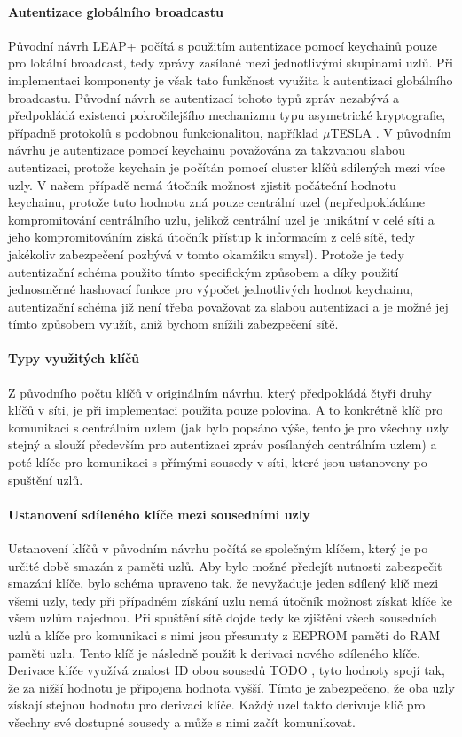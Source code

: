 \documentclass[11pt,final,twoside]{fithesis2}
\begin{document}
\paragraph{Autentizace globálního broadcastu}
Původní návrh LEAP+ počítá s použitím autentizace pomocí keychainů pouze pro lokální broadcast, tedy zprávy zasílané mezi jednotlivými skupinami uzlů. Při implementaci komponenty je však tato funkčnost 
využita k autentizaci globálního broadcastu. Původní návrh se autentizací tohoto typů zpráv nezabývá a předpokládá existenci pokročilejšího mechanizmu typu asymetrické kryptografie, případně protokolů
s podobnou funkcionalitou, například $\mu$TESLA \cite{Perrig2001}. V původním návrhu je autentizace pomocí keychainu považována za takzvanou slabou autentizaci, protože keychain je počítán pomocí 
cluster klíčů sdílených mezi více uzly. V našem případě nemá útočník možnost zjistit počáteční hodnotu keychainu, protože tuto hodnotu zná pouze centrální uzel (nepředpokládáme kompromitování centrálního
uzlu, jelikož centrální uzel je unikátní v celé síti a jeho kompromitováním získá útočník přístup k informacím z celé sítě, tedy jakékoliv zabezpečení pozbývá v tomto okamžiku smysl). Protože je tedy 
autentizační schéma použito tímto specifickým způsobem a díky použití jednosměrné hashovací funkce pro výpočet jednotlivých hodnot keychainu, autentizační schéma již není třeba považovat za slabou 
autentizaci a je možné jej tímto způsobem využít, aniž bychom snížili zabezpečení sítě.

\paragraph{Typy využitých klíčů}
Z původního počtu klíčů v originálním návrhu, který předpokládá čtyři druhy klíčů v síti, je při implementaci použita pouze polovina. A to konkrétně klíč pro komunikaci s centrálním uzlem (jak bylo popsáno 
výše, tento je pro všechny uzly stejný a slouží především pro autentizaci zpráv posílaných centrálním uzlem) a poté klíče pro komunikaci s přímými sousedy v síti, které jsou ustanoveny po spuštění uzlů. 

\paragraph{Ustanovení sdíleného klíče mezi sousedními uzly} \label{par:derive}
Ustanovení klíčů v původním návrhu počítá se společným klíčem, který je po určité době smazán z paměti uzlů. Aby bylo možné předejít nutnosti zabezpečit smazání klíče, bylo schéma upraveno tak, 
že nevyžaduje jeden sdílený klíč mezi všemi uzly, tedy při případném získání uzlu nemá útočník možnost získat klíče ke všem uzlům najednou. Při spuštění sítě dojde tedy ke zjištění všech sousedních uzlů a 
klíče pro komunikaci s nimi jsou přesunuty z EEPROM paměti do RAM paměti uzlu. Tento klíč je následně použit k derivaci nového sdíleného klíče.
Derivace klíče využívá znalost ID obou sousedů TODO , tyto hodnoty spojí tak, že za nižší hodnotu je připojena hodnota vyšší. Tímto je zabezpečeno, že oba uzly získají stejnou hodnotu pro derivaci klíče. 
Každý uzel takto derivuje klíč pro všechny své dostupné sousedy a může s nimi začít komunikovat.
\end{document}
